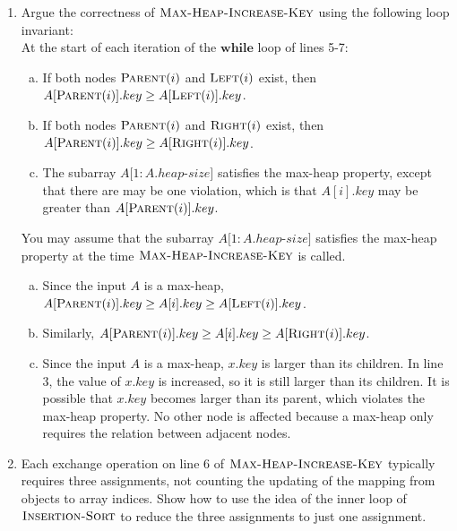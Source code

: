 \documentclass[12pt,reqno]{amsart}
\newif\ifanswer
\begin{document}
\begin{enumerate}[1.]
\item Argue the correctness of $\textsc{Max-Heap-Increase-Key}$ using the following loop invariant:\\
At the start of each iteration of the $\textbf{while}$ loop of lines 5-7:
\begin{enumerate}[a.]
\item If both nodes $\textsc{Parent}(i)$ and $\textsc{Left}(i)$ exist, then $A[\textsc{Parent}(i)].key \geq A[\textsc{Left}(i)].key$.
\item If both nodes $\textsc{Parent}(i)$ and $\textsc{Right}(i)$ exist, then $A[\textsc{Parent}(i)].key \geq A[\textsc{Right}(i)].key$.
\item The subarray $A[1: A.heap$-$size]$ satisfies the max-heap property, except that there are may be one violation, which is that $A[i].key$ may be greater than $A[\textsc{Parent}(i)].key$.
\end{enumerate}
You may assume that the subarray $A[1: A.heap$-$size]$ satisfies the max-heap property at the time $\textsc{Max-Heap-Increase-Key}$ is called.

\ifanswer
{}
\begin{enumerate}[a.]
\item Since the input $A$ is a max-heap, $A[\textsc{Parent}(i)].key \geq A[i].key \geq A[\textsc{Left}(i)].key$.
\item Similarly, $A[\textsc{Parent}(i)].key \geq A[i].key \geq A[\textsc{Right}(i)].key$.
\item Since the input $A$ is a max-heap, $x.key$ is larger than its children. In line 3, the value of $x.key$ is increased, so it is still larger than its children. It is possible that $x.key$ becomes larger than its parent, which violates the max-heap property. No other node is affected because a max-heap only requires the relation between adjacent nodes.
\end{enumerate}
\vspace{1cm}



\item Each exchange operation on line 6 of $\textsc{Max-Heap-Increase-Key}$ typically requires three assignments, not counting the updating of the mapping from objects to array indices. Show how to use the idea of the inner loop of $\textsc{Insertion-Sort}$ to reduce the three assignments to just one assignment.


\end{enumerate}
\end{document}
